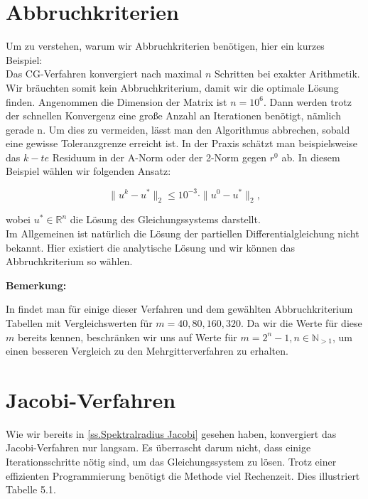 

\section{Abbruchkriterien}

Um zu verstehen, warum wir Abbruchkriterien benötigen, hier ein kurzes Beispiel:\\
Das CG-Verfahren konvergiert nach maximal $n$ Schritten bei exakter Arithmetik. Wir bräuchten somit kein Abbruchkriterium, damit wir die optimale Lösung finden. Angenommen die Dimension der Matrix ist $n = 10^{6}$. Dann werden trotz der schnellen Konvergenz eine große Anzahl an Iterationen benötigt, nämlich gerade n. Um dies zu vermeiden, lässt man den Algorithmus abbrechen, sobald eine gewisse Toleranzgrenze erreicht ist. In der Praxis schätzt man beispielsweise das $k-te$ Residuum in der A-Norm oder der 2-Norm gegen $r^{0}$ ab. In diesem Beispiel wählen wir folgenden Ansatz:

\begin{equation}
\| u^{k} - u^{*} \|_{2} \le 10^{-3} \cdot \| u^{0} - u^{*} \|_{2},
\end{equation}

wobei $u^{*} \in \mathbb{R}^{n}$ die Lösung des Gleichungssystems darstellt.\\
Im Allgemeinen ist natürlich die Lösung der partiellen Differentialgleichung nicht bekannt. Hier existiert die analytische Lösung und wir können das Abbruchkriterium so wählen.

\textbf{Bemerkung:}

In \cite{DR4} findet man für einige dieser Verfahren und dem gewählten Abbruchkriterium Tabellen mit Vergleichswerten für $m = 40,80,160,320$. Da wir die Werte für diese $m$ bereits kennen, beschränken wir uns auf Werte für $m = 2^{n} - 1, n \in \mathbb{N}_{>1}$, um einen besseren Vergleich zu den Mehrgitterverfahren zu erhalten.

\section{Jacobi-Verfahren}\label{s.Jacobi mit Beispiel}

Wie wir bereits in \autoref{ss.Spektralradius Jacobi} gesehen haben, konvergiert das Jacobi-Verfahren nur langsam. Es überrascht darum nicht, dass einige Iterationsschritte nötig sind, um das Gleichungssystem zu lösen. Trotz einer effizienten Programmierung benötigt die Methode viel Rechenzeit. Dies illustriert Tabelle 5.1.

